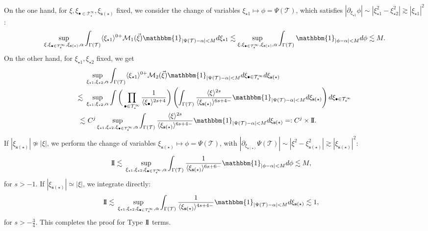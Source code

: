 \documentclass[a4paper,
11pt,  reqno]{amsart}
\newcommand{\jap}[1]{\langle #1 \rangle}
\newcommand{\II}{\textup{I \hspace{-2.9mm} I} }
\newcommand{\5}{\textup{V}}
\newcommand{\les}{\lesssim}
\theoremstyle{remark}
\newcommand{\bul}{\bullet}
\newcommand{\TT}{\mathcal{T}}
\newcommand{\G}{\Gamma}
\newcommand{\sbf}{\mathbf{s}}
\newcommand{\ges}{\gtrsim}
\newcommand{\M}{\mathcal{M}}
\numberwithin{equation}{section}
\numberwithin{theorem}{section}
\begin{document}
{On the one hand, for $\xi, \xi_{\bul\in \TT^\infty_\star}, \xi_{\sbf(\star)}$ fixed, we consider the change of variables $\xi_{\star1}\mapsto \phi=\Psi(\TT)$, which satisfies $|\partial_{\xi_{\star1}} \phi|
\sim |\xi_{\star1}^2 - \xi_{\star2}^2| \ges
|\xi_{\star1}|^2$:
\begin{align*}
    \sup_{\xi, \xi_{\bul\in \TT^\infty_\star}, \xi_{\sbf(\star)}, \alpha} \int_{\Gamma(\TT)} \jap{\xi_{\star1}}^{0+}\M_1(\vec\xi) \mathbbm{1}_{|\Psi(\TT)
    -\alpha|<M}d\xi_{\star1}\lesssim \sup_{\xi, \xi_{\bul\in \TT^\infty_\star}, \xi_{\sbf(\star)}, \alpha} \int_{\Gamma(\TT)} \mathbbm{1}_{|\phi-\alpha|<M}d\phi\lesssim M.
\end{align*}
On the other hand, for $\xi_{\star1}, \xi_{\star2}$ fixed, we get
\begin{align*}
    &\sup_{\xi_{\star1}, \xi_{\star2}, \alpha} \int_{\G(\TT)} \jap{\xi_{\star1}}^{0+}\M_2 (\vec\xi) \mathbbm{1}_{|\Psi(\TT)-\alpha|<M}d\xi_{\bul\in\TT^\infty_\star}d\xi_{\sbf(\star)} \\
    \lesssim \
    &\sup_{\xi_{\star1}, \xi_{\star2}, \alpha}
    \int
    \bigg( \prod_{\bul\in\TT^\infty_\star} \frac{1}{\jap{\xi_\bul}^{2s+4  }}
    \bigg)
    \left(\int_{\G(\TT)} \frac{\jap{\xi}^{2s}}{\jap{\xi_{\sbf(\star)}}^{6s+4-  }} \mathbbm{1}_{|\Psi(\TT)-\alpha|<M}d\xi_{\sbf(\star)} \right) d\xi_{\bul\in\TT^\infty_\star}\\\lesssim &\  C^j \sup_{\xi_{\star1}, \xi_{\star2}, \xi_{\bul\in\TT^\infty_\star}, \alpha}\int_{\G(\TT)} \frac{\jap{\xi}^{2s}}{\jap{\xi_{\sbf(\star)}}^{6s+4 - }} \mathbbm{1}_{|\Psi(\TT)-\alpha|<M}d\xi_{\sbf(\star)}
    =: C^j \times \II
    .
\end{align*}
If $|\xi_{\sbf(\star)}|\not\simeq|\xi|$, we perform the change of variables $\xi_{\sbf(\star)}\mapsto \phi= \Psi(\TT)$, with $|\partial_{\xi_{\sbf(\star)}}\Psi(\TT)|\sim |\xi^2 - \xi_{\sbf(\star)}^2| \ges |\xi_{\sbf(\star)} |^2$:
\begin{align*}
    \II
    \lesssim & \ \sup_{\xi_{\star1}, \xi_{\star2}, \xi_{\bul\in\TT^\infty_\star}, \alpha}\int_{\G(\TT)} \frac{1}{\jap{\xi_{\sbf(\star)}}^{6s+6-}} \mathbbm{1}_{|\phi-\alpha|<M}d\phi \lesssim M,
\end{align*}
for $s>-1$.
If $|\xi_{\sbf(\star)}|\simeq |\xi|$, we integrate directly:
\begin{align}
 \II
  \les
  &
  \
  \sup_{\xi_{\star1}, \xi_{\star2}, \xi_{\bul\in\TT^\infty_\star}, \alpha}\int_{\G(\TT)} \frac{1}{\jap{\xi_{\sbf(\star)}}^{4s+4 - }} \mathbbm{1}_{|\Psi(\TT)-\alpha|<M}d\xi_{\sbf(\star)} \les 1,
\end{align}
for $s>- \frac34$. This completes the proof for Type $\II$ terms.


}
\end{document}
